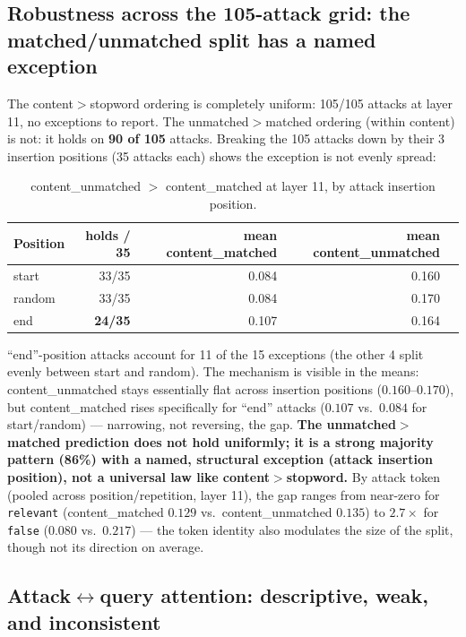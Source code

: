 \documentclass[11pt]{article}
\begin{document}
\subsection{Robustness across the 105-attack grid: the matched/unmatched split has a named exception}
\label{sec:robustness}

The content$>$stopword ordering is completely uniform: 105/105 attacks at layer 11, no
exceptions to report. The unmatched$>$matched ordering (within content) is not: it holds
on \textbf{90 of 105} attacks. Breaking the 105 attacks down by their 3 insertion
positions (35 attacks each) shows the exception is not evenly spread:

\begin{table}[H]
\centering
\caption{content\_unmatched $>$ content\_matched at layer 11, by attack insertion position.}
\label{tab:robustness}
\begin{tabular}{lrrrr}
\toprule
Position & holds / 35 & mean content\_matched & mean content\_unmatched \\
\midrule
start  & 33/35 & 0.084 & 0.160 \\
random & 33/35 & 0.084 & 0.170 \\
end    & \textbf{24/35} & 0.107 & 0.164 \\
\bottomrule
\end{tabular}
\end{table}

``end''-position attacks account for 11 of the 15 exceptions (the other 4 split evenly
between start and random). The mechanism is visible in the means: content\_unmatched stays
essentially flat across insertion positions ($0.160$--$0.170$), but content\_matched rises
specifically for ``end'' attacks ($0.107$ vs.\ $0.084$ for start/random) — narrowing, not
reversing, the gap. \textbf{The unmatched$>$matched prediction does not hold uniformly;
it is a strong majority pattern (86\%) with a named, structural exception (attack
insertion position), not a universal law like content$>$stopword.} By attack token
(pooled across position/repetition, layer 11), the gap ranges from near-zero for
\texttt{relevant} (content\_matched $0.129$ vs.\ content\_unmatched $0.135$) to
$2.7\times$ for \texttt{false} ($0.080$ vs.\ $0.217$) — the token identity also modulates
the size of the split, though not its direction on average.

\subsection{Attack$\leftrightarrow$query attention: descriptive, weak, and inconsistent}
\label{sec:attention}
\end{document}
